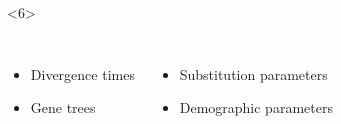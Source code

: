 \begin{frame}[t,label=fullmodel]
\begin{minipage}[t][0.45\textheight][t]{\linewidth}
\begin{onlyenv}
\begin{displaybox}[0.60\linewidth]
            \end{displaybox}
        \end{onlyenv}

        \vspace{-1.5mm}
        \begin{onlyenv}<6>
            \begin{columns}


                \begin{itemize}
                    \small
                    \item Divergence times
                    \item Gene trees
                \end{itemize}


                \begin{itemize}
                    \small
                    \item Substitution parameters
                    \item Demographic parameters
                \end{itemize}
            \end{columns}
        \end{onlyenv}
        

\end{minipage}
\end{frame}
